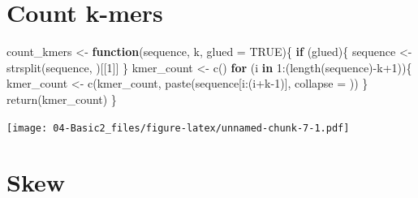 \documentclass[
]{book}
\newenvironment{Shaded}{\begin{snugshade}}{\end{snugshade}}
\newcommand{\AttributeTok}[1]{\textcolor[rgb]{0.77,0.63,0.00}{#1}}
\newcommand{\ConstantTok}[1]{\textcolor[rgb]{0.00,0.00,0.00}{#1}}
\newcommand{\ControlFlowTok}[1]{\textcolor[rgb]{0.13,0.29,0.53}{\textbf{#1}}}
\newcommand{\DecValTok}[1]{\textcolor[rgb]{0.00,0.00,0.81}{#1}}
\newcommand{\FunctionTok}[1]{\textcolor[rgb]{0.00,0.00,0.00}{#1}}
\newcommand{\NormalTok}[1]{#1}
\newcommand{\OtherTok}[1]{\textcolor[rgb]{0.56,0.35,0.01}{#1}}
\newcommand{\SpecialCharTok}[1]{\textcolor[rgb]{0.00,0.00,0.00}{#1}}
\newcommand{\StringTok}[1]{\textcolor[rgb]{0.31,0.60,0.02}{#1}}
\begin{document}
\hypertarget{count-k-mers}{%
\section{Count k-mers}\label{count-k-mers}}

\begin{Shaded}
\begin{Highlighting}[]
\NormalTok{count\_kmers }\OtherTok{\textless{}{-}} \ControlFlowTok{function}\NormalTok{(sequence, k, }\AttributeTok{glued =} \ConstantTok{TRUE}\NormalTok{)\{}
  \ControlFlowTok{if}\NormalTok{ (glued)\{}
\NormalTok{    sequence }\OtherTok{\textless{}{-}} \FunctionTok{strsplit}\NormalTok{(sequence, }\StringTok{\textquotesingle{}\textquotesingle{}}\NormalTok{)[[}\DecValTok{1}\NormalTok{]]}
\NormalTok{  \}}
\NormalTok{  kmer\_count }\OtherTok{\textless{}{-}} \FunctionTok{c}\NormalTok{()}
  \ControlFlowTok{for}\NormalTok{ (i }\ControlFlowTok{in} \DecValTok{1}\SpecialCharTok{:}\NormalTok{(}\FunctionTok{length}\NormalTok{(sequence)}\SpecialCharTok{{-}}\NormalTok{k}\SpecialCharTok{+}\DecValTok{1}\NormalTok{))\{}
\NormalTok{    kmer\_count }\OtherTok{\textless{}{-}} \FunctionTok{c}\NormalTok{(kmer\_count, }\FunctionTok{paste}\NormalTok{(sequence[i}\SpecialCharTok{:}\NormalTok{(i}\SpecialCharTok{+}\NormalTok{k}\DecValTok{{-}1}\NormalTok{)], }\AttributeTok{collapse =} \StringTok{\textquotesingle{}\textquotesingle{}}\NormalTok{))}
\NormalTok{  \}}
  \FunctionTok{return}\NormalTok{(kmer\_count)}
\NormalTok{\}}
\end{Highlighting}
\end{Shaded}

\begin{Shaded}
\end{Shaded}

\texttt{[image: 04-Basic2\_files/figure-latex/unnamed-chunk-7-1.pdf]}

\hypertarget{skew}{%
\section{Skew}\label{skew}}
\end{document}
